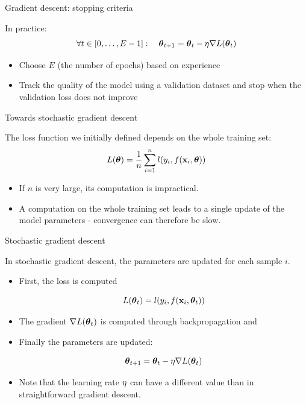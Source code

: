 \documentclass[xcolor=pdftex,dvipsnames,table,mathserif]{beamer}
\begin{document}
\begin{frame}{Gradient descent: stopping criteria}

  In practice:
  \[
  \forall t \in [0, \ldots, E-1]:\quad \boldsymbol{\theta}_{t+1} = \boldsymbol{\theta}_t - \eta \nabla L(\boldsymbol{\theta}_t)
  \]

  \begin{itemize}
  \item Choose $E$ (the number of \alert{epochs}) based on experience
  \item Track the quality of the model using a validation dataset and stop when the validation loss does not improve
  \end{itemize}


\end{frame}
\begin{frame}{Towards stochastic gradient descent}

  The loss function we initially defined depends on the whole training set:
  \[
  L(\boldsymbol{\theta}) = \frac{1}{n} \sum\limits_{i=1}^n l(y_i, f(\mathbf{x}_i, \boldsymbol{\theta}))
  \]

  \pause

  \begin{itemize}[<+->]
  \item If $n$ is very large, its computation is impractical.
  \item A computation on the whole training set leads to a single update of the model parameters - convergence can therefore be slow.
  \end{itemize}

\end{frame}

\begin{frame}{Stochastic gradient descent}

  In \alert{stochastic gradient descent}, the parameters are updated for each sample $i$.

  \begin{itemize}[<+->]
  \item
    First, the loss is computed

    \[
    L(\boldsymbol{\theta}_t) = l(y_i, f(\mathbf{x}_i, \boldsymbol{\theta}_t))
    \]
  \item
    The gradient $\nabla L(\boldsymbol{\theta}_t)$ is computed through backpropagation and
  \item Finally the parameters are updated:

    \[
    \boldsymbol{\theta}_{t+1} = \boldsymbol{\theta}_t - \eta\nabla L(\boldsymbol{\theta}_t)
    \]
  \item
    Note that the learning rate $\eta$ can have a different value than in straightforward gradient descent.
  \end{itemize}




\end{frame}
\end{document}

